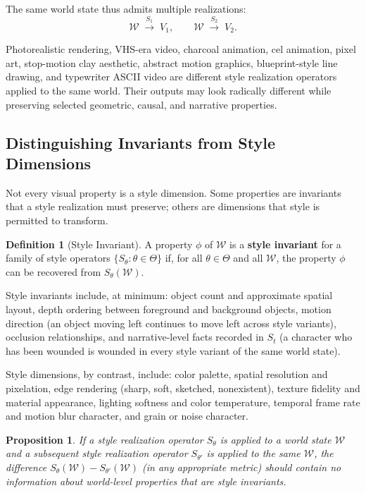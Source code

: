 \documentclass[11pt,a4paper]{article}
\theoremstyle{plain}
\newtheorem{proposition}[theorem]{Proposition}
\theoremstyle{definition}
\newtheorem{definition}[theorem]{Definition}
\theoremstyle{remark}
\begin{document}
The same world state thus admits multiple realizations:
\[
\mathcal{W} \;\xrightarrow{S_1}\; V_1, \qquad \mathcal{W} \;\xrightarrow{S_2}\; V_2.
\]

Photorealistic rendering, VHS-era video, charcoal animation, cel animation, pixel art, stop-motion clay aesthetic, abstract motion graphics, blueprint-style line drawing, and typewriter ASCII video are different style realization operators applied to the same world. Their outputs may look radically different while preserving selected geometric, causal, and narrative properties.

\subsection{Distinguishing Invariants from Style Dimensions}

Not every visual property is a style dimension. Some properties are invariants that a style realization must preserve; others are dimensions that style is permitted to transform.

\begin{definition}[Style Invariant]
A property $\phi$ of $\mathcal{W}$ is a \textbf{style invariant} for a family of style operators $\{S_\theta : \theta \in \Theta\}$ if, for all $\theta \in \Theta$ and all $\mathcal{W}$, the property $\phi$ can be recovered from $S_\theta(\mathcal{W})$.
\end{definition}

Style invariants include, at minimum: object count and approximate spatial layout, depth ordering between foreground and background objects, motion direction (an object moving left continues to move left across style variants), occlusion relationships, and narrative-level facts recorded in $S_t$ (a character who has been wounded is wounded in every style variant of the same world state).

Style dimensions, by contrast, include: color palette, spatial resolution and pixelation, edge rendering (sharp, soft, sketched, nonexistent), texture fidelity and material appearance, lighting softness and color temperature, temporal frame rate and motion blur character, and grain or noise character.

\begin{proposition}
If a style realization operator $S_\theta$ is applied to a world state $\mathcal{W}$ and a subsequent style realization operator $S_{\theta'}$ is applied to the same $\mathcal{W}$, the difference $S_\theta(\mathcal{W}) - S_{\theta'}(\mathcal{W})$ (in any appropriate metric) should contain no information about world-level properties that are style invariants.
\end{proposition}
\end{document}
